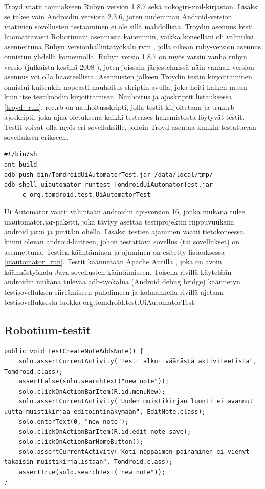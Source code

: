 Troyd vaatii toimiakseen Rubyn version 1.8.7 sekä nokogiri-xml-kirjaston. Lisäksi se tukee vain Androidin versiota 2.3.6, joten uudemman Android-version vaativien sovellusten testaaminen ei ole sillä mahdollista. Troydin asennus kesti huomattavasti Robotiumin asennusta kauemmin, vaikka koneellani oli valmiiksi asennettuna Rubyn versionhallintatyökalu rvm \cite{rvm}, jolla oikean ruby-version asennus onnistuu yhdellä komennolla. Rubyn versio 1.8.7 on myös varsin vanha rubyn versio (julkaistu kesällä 2008 \cite{ruby_187}), joten joissain järjestelmissä näin vanhan version asennus voi olla haasteellista. Asennusten jälkeen Troydin testin kirjoittaminen onnistui kuitenkin nopeasti nauhoitus-skriptin avulla, joka hoiti kaiken muun kuin itse testikoodin kirjoittamisen. Nauhoitus ja ajoskriptit listauksessa \ref{troyd_run}. rec.rb on nauhoitusskripti, jolla testit kirjoitetaan ja trun.rb ajoskripti, joka ajaa oletuksena kaikki testcases-hakemistosta löytyvät testit. Testit voivat olla myös eri sovelluksille, jolloin Troyd asentaa kunkin testattavan sovelluksen erikseen.

\begin{lstlisting}[float, label=uiautomator_run,caption=Uiautomator-testien ajaminen]
#!/bin/sh
ant build
adb push bin/TomdroidUiAutomatorTest.jar /data/local/tmp/
adb shell uiautomator runtest TomdroidUiAutomatorTest.jar 
    -c org.tomdroid.test.UiAutomatorTest
\end{lstlisting}

Ui Automator vaatii vähintään androidin api-version 16, jonka mukana tulee uiautomator.jar-paketti, joka täytyy asettaa testiprojektin riippuvuuksiin android.jar:n ja junit3:n ohella. Lisäksi testien ajaminen vaatii tietokoneessa kiinni olevan android-laitteen, johon testattava sovellus (tai sovellukset) on asennettuna. Testien kääntäminen ja ajaminen on esitetty listauksessa \ref{uiautomator_run}. Testit käännetään Apache Antilla \cite{ant}, joka on avoin käännöstyökalu Java-sovellusten kääntämiseen. Toisella rivillä käytetään androidin mukana tulevaa adb-työkalua (Android debug bridge) käännetyn testisovelluksen siirtämiseen puhelimeen ja kolmannella rivillä ajetaan testisovelluksesta luokka org.tomdroid.test.UiAutomatorTest.

\subsection{Robotium-testit}

\begin{lstlisting}[float,label=robotium_createnote,caption=Muistikirjan luontitesti robotiumilla]
public void testCreateNoteAddsNote() {
	solo.assertCurrentActivity("Testi alkoi väärästä aktiviteetista", Tomdroid.class);
	assertFalse(solo.searchText("new note"));
	solo.clickOnActionBarItem(R.id.menuNew);
	solo.assertCurrentActivity("Uuden muistikirjan luonti ei avannut uutta muistikirjaa editointinäkymään", EditNote.class);
	solo.enterText(0, "new note");
	solo.clickOnActionBarItem(R.id.edit_note_save);
	solo.clickOnActionBarHomeButton();
	solo.assertCurrentActivity("Koti-näppäimen painaminen ei vienyt takaisin muistikirjalistaan", Tomdroid.class);
	assertTrue(solo.searchText("new note"));
}
\end{lstlisting}

